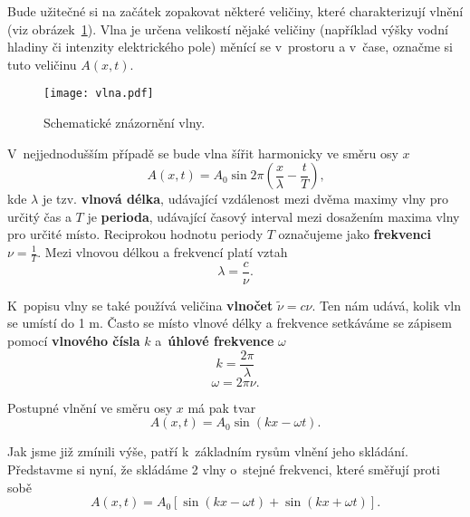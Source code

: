 Bude užitečné si na začátek zopakovat některé veličiny, které charakterizují vlnění (viz obrázek~\ref{obr:Vlna}).
Vlna je určena velikostí nějaké veličiny (například výšky vodní hladiny či intenzity elektrického pole) měnící se v~prostoru a v~čase, označme si tuto veličinu $A(x,t)$. 
\begin{figure} [ht]
\centering
\texttt{[image: vlna.pdf]}
\caption[Znázornění vlny]{Schematické  znázornění vlny.}
\label{obr:Vlna}
\end{figure}

V~nejjednodušším případě se bude vlna šířit harmonicky ve směru osy $x$
\begin{equation}
A(x, t) = A_0 \sin2\pi \left ( \frac{x}{\lambda}-\frac{t}{T} \right) \mbox{,}
\label{rov:Vlna}
\end{equation}
kde $\lambda$ je tzv. \textbf{vlnová délka}, udávající vzdálenost mezi dvěma maximy vlny pro určitý čas a $T$ je \textbf{perioda}, udávající časový interval mezi dosažením maxima vlny pro určité místo. Reciprokou hodnotu periody $T$ označujeme jako  \textbf{frekvenci} $\nu = \frac{1}{T}$. Mezi vlnovou délkou a frekvencí platí vztah
\begin{equation}
\lambda = \frac{c}{\nu}\mbox{.}
\label{rov:Vlna2}
\end{equation}

\noindent K~popisu vlny se také používá veličina \textbf{vlnočet} $\tilde{\nu}=c\nu$\mbox{.} Ten nám udává, kolik vln se umístí do 1 m.
Často se místo vlnové délky a frekvence setkáváme se zápisem pomocí \textbf{vlnového čísla} $k$ a~\textbf{úhlové frekvence} $\omega$
\begin{equation}
k = \frac{2\pi}{\lambda}\mbox{}
\label{rov:Vlna3}
\end{equation}
\begin{equation}
\omega = 2\pi\nu\mbox{.}
\label{rov:Vlna4}
\end{equation}

\noindent Postupné vlnění ve směru osy $x$ má pak tvar
\begin{equation}
A(x,t)=A_0 \sin(kx - \omega t).
\label{rov:Vlna5}
\end{equation}

\noindent Jak jsme již zmínili výše, patří k~základním rysům vlnění jeho skládání. Představme si nyní, že skládáme 2 vlny o~stejné frekvenci, které směřují proti sobě
\begin{equation}
A(x,t)=A_0[\sin (kx-\omega t)+ \sin (kx+\omega t)]\mbox{.}
\label{rov:Vlna6}
\end{equation}

